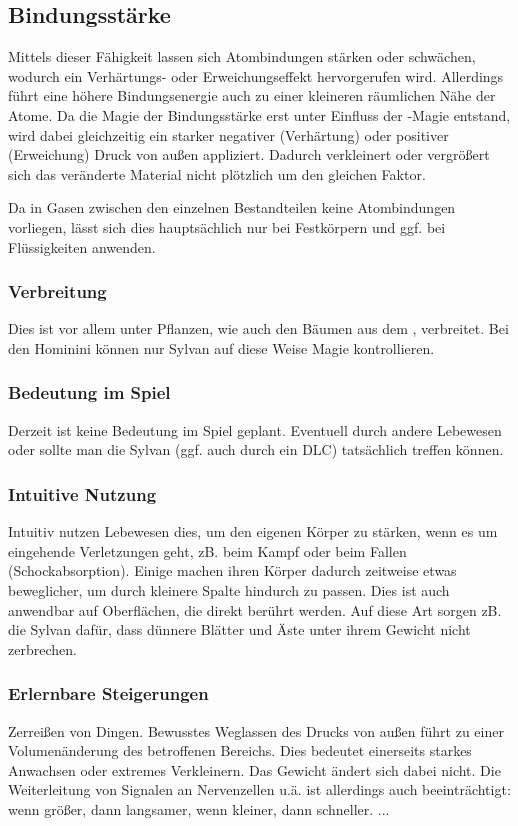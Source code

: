 \subsection{Bindungsstärke}\label{magie:bindung}
Mittels dieser Fähigkeit lassen sich Atombindungen stärken oder schwächen, wodurch ein Verhärtungs- oder Erweichungseffekt hervorgerufen wird. 
Allerdings führt eine höhere Bindungsenergie auch zu einer kleineren räumlichen Nähe der Atome. 
Da die Magie der Bindungsstärke erst unter Einfluss der -Magie entstand, wird dabei gleichzeitig ein starker negativer (Verhärtung) oder positiver (Erweichung) Druck von außen appliziert. 
Dadurch verkleinert oder vergrößert sich das veränderte Material nicht plötzlich um den gleichen Faktor.

Da in Gasen zwischen den einzelnen Bestandteilen keine Atombindungen vorliegen, lässt sich dies hauptsächlich nur bei Festkörpern und ggf. bei Flüssigkeiten anwenden.

\subsubsection{Verbreitung}
Dies ist vor allem unter Pflanzen, wie auch den Bäumen aus dem , verbreitet.
Bei den Hominini können nur Sylvan auf diese Weise Magie kontrollieren.

\subsubsection{Bedeutung im Spiel}
Derzeit ist keine Bedeutung im Spiel geplant. 
Eventuell durch andere Lebewesen oder sollte man die Sylvan (ggf. auch durch ein DLC) tatsächlich treffen können.

\subsubsection{Intuitive Nutzung}
Intuitiv nutzen Lebewesen dies, um den eigenen Körper zu stärken, wenn es um eingehende Verletzungen geht, zB. beim Kampf oder beim Fallen (Schockabsorption). 
Einige machen ihren Körper dadurch zeitweise etwas beweglicher, um durch kleinere Spalte hindurch zu passen.
Dies ist auch anwendbar auf Oberflächen, die direkt berührt werden. 
Auf diese Art sorgen zB. die Sylvan dafür, dass dünnere Blätter und Äste unter ihrem Gewicht nicht zerbrechen.

\subsubsection{Erlernbare Steigerungen}
\begin{outline}
	\1 Zerreißen von Dingen.
	\1 Bewusstes Weglassen des Drucks von außen führt zu einer Volumenänderung des betroffenen Bereichs. 
	Dies bedeutet einerseits starkes Anwachsen oder extremes Verkleinern. 
	Das Gewicht ändert sich dabei nicht. 
	Die Weiterleitung von Signalen an Nervenzellen u.ä. ist allerdings auch beeinträchtigt: wenn größer, dann langsamer, wenn kleiner, dann schneller.
	\1 ...
\end{outline}

